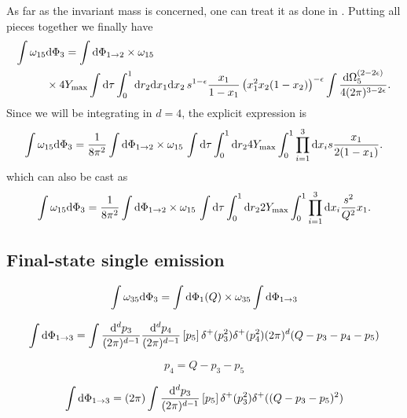 \documentclass[a4paper,11pt]{article}
\begin{document}
As far as the invariant mass is concerned, one can treat it as done in . Putting all pieces together we finally have
\begin{align}
\int \omega_{15} &\rd\Phi_3 = 
\int \rd\Phi_{1\to 2} \times \omega_{15} \nonumber \\
&\times 4 Y_{\max} \int\rd \tau
%
\int^1_0 \rd r_2 \rd x_1 \rd x_2\,
s^{1-\epsilon}
\frac{x_1}{1-x_1} \left(x_1^2 x_2 (1-x_2)\right)^{-\epsilon}
\int \frac{\rd\Omega^{(2-2\epsilon)}_5}{4(2\pi)^{3-2\epsilon}}.
\end{align}
Since we will be integrating in $d=4$, the explicit expression is
\begin{equation}
\int \omega_{15} \mathrm d\Phi_3 = \frac{1}{8\pi^2}
\int \mathrm d\Phi_{1\to 2} \times \omega_{15} \,
\int\mathrm d \tau \int^1_0 \mathrm d r_2 4Y_{\max}
\int^1_0 \prod_{i=1}^3 \mathrm d x_i s \frac{x_1}{2(1-x_1)}.
\end{equation}
which can also be cast as 
\begin{equation}
\int \omega_{15} \mathrm d\Phi_3 = \frac{1}{8\pi^2}
\int \mathrm d\Phi_{1\to 2} \times \omega_{15} \,
\int\mathrm d \tau \int^1_0 \mathrm d r_2 2Y_{\max}
\int^1_0 \prod_{i=1}^3 \mathrm d x_i \frac{s^2}{Q^2} x_1.
\end{equation}

\subsection{Final-state single emission}
\label{se:FSNLO}

\begin{equation}
\int \omega_{35}\mathrm d\Phi_3 = \int\mathrm d\Phi_{1}(Q)\times 
\omega_{35} \int \mathrm d\Phi_{1\to 3}
\end{equation}

\begin{equation}
\int \mathrm d\Phi_{1\to 3} = \int 
\frac{\mathrm d^d p_3}{(2\pi)^{d-1}} \frac{\mathrm d^d p_4}{(2\pi)^{d-1}} \left[p_5\right]
\delta^{+}(p^2_3)\delta^{+}(p^2_4) (2\pi)^d (Q-p_3-p_4-p_5)
\end{equation}

\begin{equation}
p_4 = Q - p_3 - p_5
\end{equation}

\begin{equation}
\int \mathrm d\Phi_{1\to 3} = (2\pi)\int 
\frac{\mathrm d^d p_3}{(2\pi)^{d-1}} \left[p_5\right]
\delta^{+}(p^2_3)\delta^{+}((Q-p_3-p_5)^2)
\end{equation}
\end{document}
